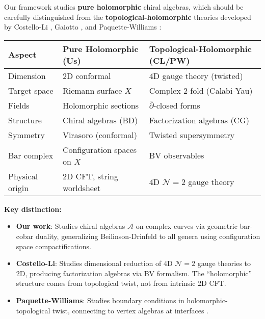 \begin{remark}\label{rem:pure-vs-topological-holomorphic}
Our framework studies \textbf{pure holomorphic} chiral algebras, which should be 
carefully distinguished from the \textbf{topological-holomorphic} theories developed 
by Costello-Li \cite{CL16}, Gaiotto \cite{Gai19}, and Paquette-Williams 
\cite{PW22}:

\begin{center}
\small
\begin{tabular}{|l|l|l|}
\hline
\textbf{Aspect} & \textbf{Pure Holomorphic (Us)} & \textbf{Topological-Holomorphic (CL/PW)} \\
\hline
Dimension & 2D conformal & 4D gauge theory (twisted) \\
Target space & Riemann surface $X$ & Complex 2-fold (Calabi-Yau) \\
Fields & Holomorphic sections & $\bar{\partial}$-closed forms \\
Structure & Chiral algebras (BD) & Factorization algebras (CG) \\
Symmetry & Virasoro (conformal) & Twisted supersymmetry \\
Bar complex & Configuration spaces on $X$ & BV observables \\
Physical origin & 2D CFT, string worldsheet & 4D $\mathcal{N}=2$ gauge theory \\
\hline
\end{tabular}
\end{center}

\textbf{Key distinction:} 
\begin{itemize}
\item \textbf{Our work}: Studies chiral algebras $\mathcal{A}$ on complex curves via 
geometric bar-cobar duality, generalizing Beilinson-Drinfeld to all genera using 
configuration space compactifications.

\item \textbf{Costello-Li}: Studies dimensional reduction of 4D $\mathcal{N}=2$ 
gauge theories to 2D, producing factorization algebras via BV formalism. The ``holomorphic'' 
structure comes from topological twist, not from intrinsic 2D CFT.

\item \textbf{Paquette-Williams}: Studies boundary conditions in holomorphic-topological 
twist, connecting to vertex algebras at interfaces \cite{PW22}.
\end{itemize}
\end{remark}


